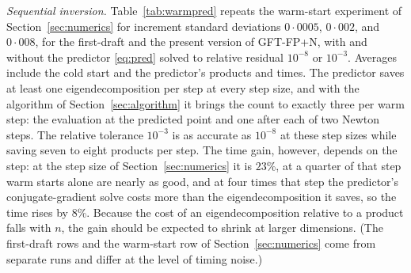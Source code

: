 \documentclass[11pt]{article}
\begin{document}
\emph{Sequential inversion.} Table~\ref{tab:warmpred} repeats the
warm-start experiment of Section~\ref{sec:numerics} for increment
standard deviations $0{\cdot}0005$, $0{\cdot}002$, and $0{\cdot}008$,
for the first-draft and the present version of GFT-FP+N, with and
without the predictor \eqref{eq:pred} solved to relative residual
$10^{-8}$ or $10^{-3}$. Averages include the cold start and the
predictor's products and times. The predictor saves at least one eigendecomposition per step at every
step size, and with the algorithm of Section~\ref{sec:algorithm} it
brings the count to exactly three per warm step: the evaluation at
the predicted point and one after each of two Newton steps. The
relative tolerance $10^{-3}$ is as accurate as $10^{-8}$ at these step
sizes while saving seven to eight products per step. The time gain,
however, depends on the step: at the step size of
Section~\ref{sec:numerics} it is $23$\%, at a quarter of that step
warm starts alone are nearly as good, and at four times that step the
predictor's conjugate-gradient solve costs more than the
eigendecomposition it saves, so the time rises by $8$\%. Because the
cost of an eigendecomposition relative to a product falls with $n$,
the gain should be expected to shrink at larger dimensions. (The
first-draft rows and the warm-start row of Section~\ref{sec:numerics}
come from separate runs and differ at the level of timing noise.)
\end{document}
